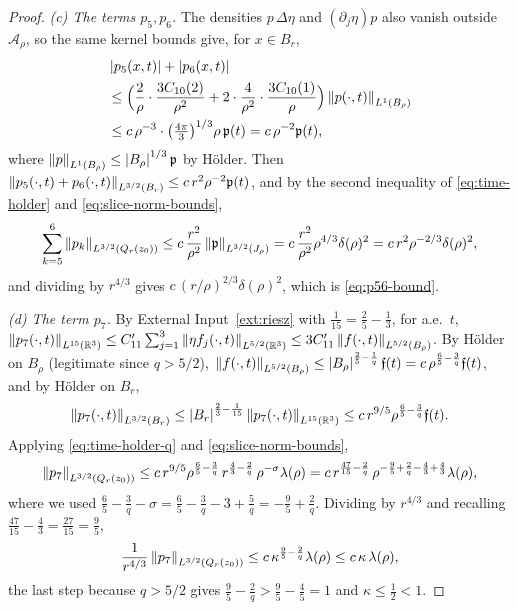 \documentclass[11pt,reqno]{amsart}
\begin{document}
\begin{proof}
\emph{(c) The terms $p_{5},p_{6}$.} The densities $p\,\Delta\eta$ and
$(\partial_{j}\eta)p$ also vanish outside $\mathcal{A}_{\rho}$, so the same kernel
bounds give, for $x\in B_{r}$,
\[
\begin{aligned}
&\left\lvert p_{5}(x,t) \right\rvert+\left\lvert p_{6}(x,t) \right\rvert
\\ &\le\Bigl(\frac2\rho\cdot\frac{3C_{10}(2)}{\rho^{2}}
     +2\cdot\frac{4}{\rho^{2}}\cdot\frac{3C_{10}(1)}{\rho}\Bigr)
     \left\lVert p(\cdot,t) \right\rVert_{L^{1}(B_{\rho})}
\\ &\le c\,\rho^{-3}\cdot\bigl(\tfrac{4\pi}{3}\bigr)^{1/3}\rho\,\mathfrak{p}(t)
  = c\,\rho^{-2}\mathfrak{p}(t),
\end{aligned}
\]
where $\left\lVert p \right\rVert_{L^{1}(B_{\rho})}\le\left\lvert B_{\rho} \right\rvert^{1/3}\mathfrak{p}$ by
H\"older. Then
$\left\lVert p_{5}(\cdot,t)+p_{6}(\cdot,t) \right\rVert_{L^{3/2}(B_{r})}
 \le c\,r^{2}\rho^{-2}\mathfrak{p}(t)$, and by the second inequality of
\eqref{eq:time-holder} and \eqref{eq:slice-norm-bounds},
\[
  \sum_{k=5}^{6}\left\lVert p_{k} \right\rVert_{L^{3/2}(Q_{r}(z_{0}))}
  \le c\,\frac{r^{2}}{\rho^{2}}\left\lVert \mathfrak{p} \right\rVert_{L^{3/2}(J_{\rho})}
  = c\,\frac{r^{2}}{\rho^{2}}\rho^{4/3}\delta(\rho)^{2}
  = c\,r^{2}\rho^{-2/3}\delta(\rho)^{2} ,
\]
and dividing by $r^{4/3}$ gives $c\,(r/\rho)^{2/3}\delta(\rho)^{2}$, which is
\eqref{eq:p56-bound}.

\emph{(d) The term $p_{7}$.} By External Input~\ref{ext:riesz} with
$\tfrac1{15}=\tfrac25-\tfrac13$, for a.e.\ $t$,
$\left\lVert p_{7}(\cdot,t) \right\rVert_{L^{15}(\mathbb{R}^{3})}
 \le C'_{11}\sum_{j=1}^{3}\left\lVert \eta f_j(\cdot,t) \right\rVert_{L^{5/2}(\mathbb{R}^{3})}
 \le 3C'_{11}\left\lVert f(\cdot,t) \right\rVert_{L^{5/2}(B_{\rho})}$. By H\"older on $B_{\rho}$
(legitimate since $q>5/2$),
$\left\lVert f(\cdot,t) \right\rVert_{L^{5/2}(B_{\rho})}
 \le\left\lvert B_{\rho} \right\rvert^{\frac25-\frac1q}\mathfrak{f}(t)
 = c\,\rho^{\frac65-\frac3q}\mathfrak{f}(t)$, and by H\"older on $B_{r}$,
\[
  \left\lVert p_{7}(\cdot,t) \right\rVert_{L^{3/2}(B_{r})}
  \le\left\lvert B_{r} \right\rvert^{\frac23-\frac1{15}}\left\lVert p_{7}(\cdot,t) \right\rVert_{L^{15}(\mathbb{R}^{3})}
  \le c\,r^{9/5}\rho^{\frac65-\frac3q}\mathfrak{f}(t).
\]
Applying \eqref{eq:time-holder-q} and \eqref{eq:slice-norm-bounds},
\[
  \left\lVert p_{7} \right\rVert_{L^{3/2}(Q_{r}(z_{0}))}
  \le c\,r^{9/5}\rho^{\frac65-\frac3q}\,r^{\frac43-\frac2q}\,
       \rho^{-\sigma}\lambda(\rho)
  = c\,r^{\frac{47}{15}-\frac2q}\,\rho^{-\frac95+\frac2q-\frac43+\frac43}
       \lambda(\rho),
\]
where we used $\tfrac65-\tfrac3q-\sigma=\tfrac65-\tfrac3q-3+\tfrac5q
=-\tfrac95+\tfrac2q$. Dividing by $r^{4/3}$ and recalling
$\tfrac{47}{15}-\tfrac43=\tfrac{27}{15}=\tfrac95$,
\[
  \frac{1}{r^{4/3}}\left\lVert p_{7} \right\rVert_{L^{3/2}(Q_{r}(z_{0}))}
  \le c\,\kappa^{\frac95-\frac2q}\lambda(\rho)\le c\,\kappa\,\lambda(\rho),
\]
the last step because $q>5/2$ gives $\tfrac95-\tfrac2q>\tfrac95-\tfrac45=1$ and
$\kappa\le\tfrac12<1$.


\end{proof}
\end{document}
